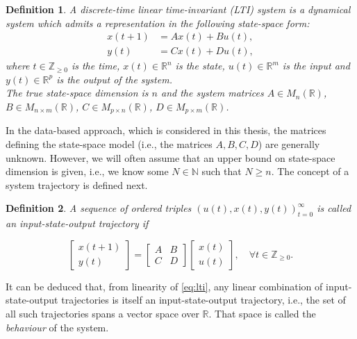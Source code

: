 \documentclass[12pt,a4paper]{report}
\newtheorem{definition}{Definition}
\begin{document}
\begin{definition}
    A discrete-time linear time-invariant (LTI) system is a dynamical system which admits a representation in the following state-space form:
    \begin{subequations}
        \begin{align}
            x(t+1) &= Ax(t) + Bu(t), \\
            y(t) &= Cx(t) + Du(t),
        \end{align}
        \label{eq:lti}
    \end{subequations}
    where \(t \in \mathbb{Z}_{\ge 0}\) is the time, \(x(t) \in \mathbb{R}^{n}\) is the state, \(u(t) \in \mathbb{R}^{m}\) is the input
    and \(y(t) \in \mathbb{R}^{p}\) is the output of the system. \\
    The true state-space dimension is $n$ and the system matrices \(A \in M_n(\mathbb{R})\), \(B \in M_{n \times m}(\mathbb{R})\),
    \(C \in M_{p \times n}(\mathbb{R})\), \(D \in M_{p \times m}(\mathbb{R})\).
\end{definition}

In the data-based approach, which is considered in this thesis, the matrices defining the state-space model (i.e., the matrices $A, B, C, D$) are generally unknown. However,
we will often assume that an upper bound on state-space dimension is given, i.e., we know some $N \in \mathbb{N}$ such that $N \geq n$. The concept of a system trajectory is defined next.

\begin{definition}
    A sequence of ordered triples \(\left( u(t), x(t), y(t) \right)_{t=0}^{\infty}\) is called an input-state-output trajectory
    if

    \[ \begin{bmatrix} x(t+1) \\ y(t) \end{bmatrix} = \begin{bmatrix} A & B \\ C & D  \end{bmatrix}
    \begin{bmatrix} x(t) \\ u(t)\end{bmatrix}, \quad \forall t \in \mathbb{Z}_{\geq 0}.\]

\end{definition}

It can be deduced that, from linearity of \eqref{eq:lti}, any linear combination of input-state-output
trajectories is itself an input-state-output trajectory, i.e., the set of all such trajectories spans a vector space over $\mathbb{R}$.
That space is called the \textit{behaviour} \cite{polderman1998mathematicalsystems} of the system.
\end{document}
